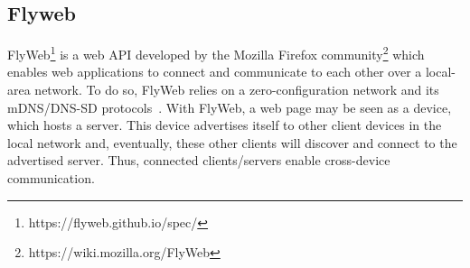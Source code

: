 \subsection{Flyweb}
\label{sec:flyweb}

FlyWeb\footnote{https://flyweb.github.io/spec/} is a web API developed by the Mozilla Firefox community\footnote{https://wiki.mozilla.org/FlyWeb} which enables web applications to connect and communicate to each other over a local-area network. 
To do so, FlyWeb relies on a zero-configuration network and its mDNS/DNS-SD protocols~\cite{rfc6762, rfc6763}. With FlyWeb, a web page may be seen as a device, which hosts a server. This device advertises itself to other client devices in the local network and, eventually, these other clients will discover and connect to the advertised server. Thus, connected clients/servers enable cross-device communication.